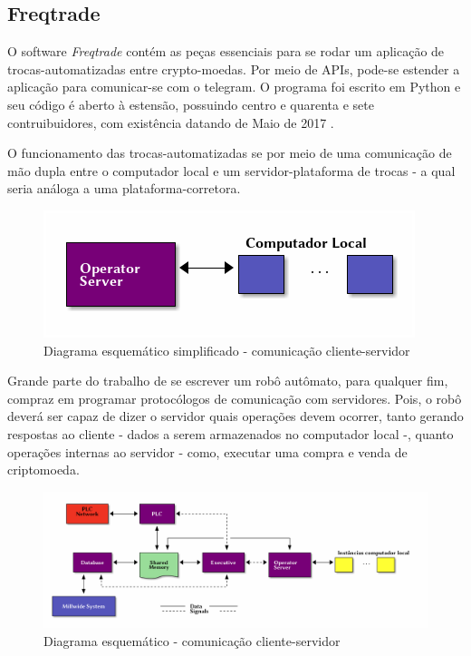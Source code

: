 \documentclass[
12pt,				%
openright,			%
oneside,			%
a4paper,			%
english,			%
french,				%
spanish,			%
brazil,				%
]{abntex2}
\begin{document}
\subsection{Freqtrade}
O software \emph{Freqtrade} contém as peças essenciais para se rodar
um aplicação de trocas-automatizadas entre crypto-moedas. Por meio de
APIs, pode-se estender a aplicação para comunicar-se com o
telegram. O programa foi escrito em Python e seu código é aberto à
estensão, possuindo centro e quarenta e sete contruibuidores, com existência datando de Maio de 2017 \cite{fang2020cryptocurrency}.

O funcionamento das trocas-automatizadas se por meio de uma
comunicação de mão dupla entre o computador local e um
servidor-plataforma de trocas - a qual seria análoga a uma
plataforma-corretora.

\begin{figure}[ht]
  \centering
  \caption{\label{fig:diagrama-freqtrade} Diagrama esquemático simplificado -
    comunicação cliente-servidor}
  \includegraphics[width=0.6\linewidth]{Imagens/server-client-fq_4.png}
\end{figure}

Grande parte do trabalho de se escrever um robô autômato, para
qualquer fim, compraz em programar protocólogos de comunicação com
servidores. Pois, o robô deverá ser capaz de dizer o servidor quais
operações devem ocorrer, tanto gerando respostas ao cliente - dados a
serem armazenados no computador local -, quanto operações internas ao
servidor - como, executar uma compra e venda de criptomoeda.

\begin{figure}[ht]
  \centering
  \caption{\label{fig:diagrama-freqtrade2} Diagrama esquemático -
    comunicação cliente-servidor}
  \includegraphics[width=1\linewidth]{ditaa_4.png}
\end{figure}
\end{document}
